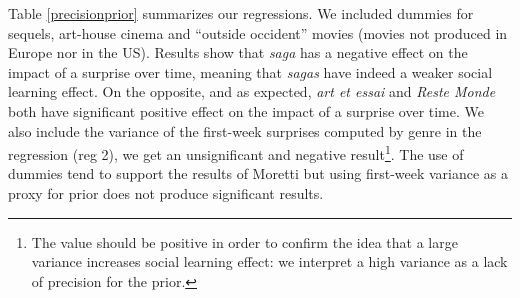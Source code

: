 Table \ref{precisionprior} summarizes our regressions. We included dummies for sequels, art-house cinema and ``outside occident'' movies (movies not produced in Europe nor in the US). Results show that \textit{saga} has a negative effect on the impact of a surprise over time, meaning that \textit{sagas} have indeed a weaker social learning effect. On the opposite, and as expected, \textit{art et essai} and \textit{Reste Monde} both have significant positive effect on the impact of a surprise over time. We also include the variance of the first-week surprises computed by genre in the regression (reg 2), we get an unsignificant and negative result\footnote{The value should be positive in order to confirm the idea that a large variance increases social learning effect: we interpret a high variance as a lack of precision for the prior.}. The use of dummies tend to support the results of Moretti but using first-week variance as a proxy for prior does not produce significant results.
